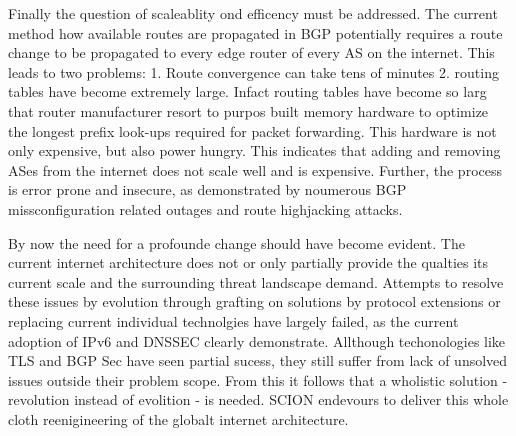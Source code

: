 \documentclass[../eva1_scion.tex]{subfiles}
\begin{document}
Finally the question of scaleablity ond efficency must be addressed. The current method how available routes are propagated in BGP potentially requires a route change to be propagated to every edge router of every AS on the internet. This leads to two problems: 1. Route convergence can take tens of minutes \cite{route_convergence} 2. routing tables have become extremely large. Infact routing tables have become so larg that router manufacturer resort to purpos built memory hardware to optimize the longest prefix look-ups required for packet forwarding. This hardware is not only expensive, but also power hungry. This indicates that adding and removing ASes from the internet does not scale well and is expensive. Further, the process is error prone and insecure, as demonstrated by noumerous BGP missconfiguration related outages and route highjacking attacks.

By now the need for a profounde change should have become evident. The current internet architecture does not or only partially provide the qualties its current scale and the surrounding threat landscape demand. Attempts to resolve these issues by evolution through grafting on solutions by protocol extensions or replacing current individual technolgies have largely failed, as the current adoption of IPv6 and DNSSEC clearly demonstrate. Allthough techonologies like TLS and BGP Sec have seen partial sucess, they still suffer from lack of unsolved issues outside their problem scope. From this it follows that a wholistic solution - revolution instead of evolition - is needed. SCION endevours to deliver this whole cloth reenigineering of the globalt internet architecture.
\end{document}

